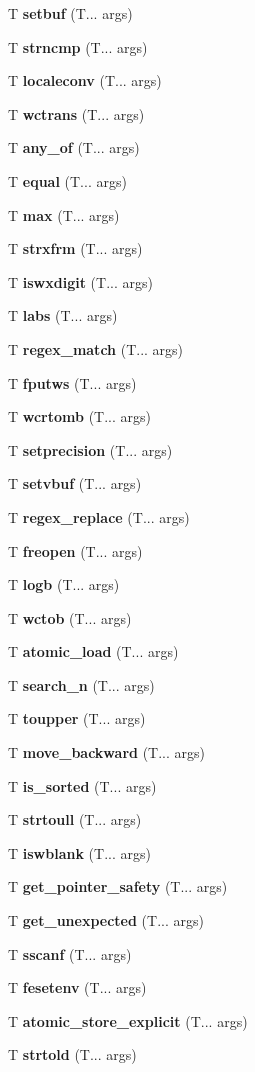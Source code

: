 \begin{DoxyCompactItemize}
T \textbf{ setbuf} (T... args)
\item 
T \textbf{ strncmp} (T... args)
\item 
T \textbf{ localeconv} (T... args)
\item 
T \textbf{ wctrans} (T... args)
\item 
T \textbf{ any\+\_\+of} (T... args)
\item 
T \textbf{ equal} (T... args)
\item 
T \textbf{ max} (T... args)
\item 
T \textbf{ strxfrm} (T... args)
\item 
T \textbf{ iswxdigit} (T... args)
\item 
T \textbf{ labs} (T... args)
\item 
T \textbf{ regex\+\_\+match} (T... args)
\item 
T \textbf{ fputws} (T... args)
\item 
T \textbf{ wcrtomb} (T... args)
\item 
T \textbf{ setprecision} (T... args)
\item 
T \textbf{ setvbuf} (T... args)
\item 
T \textbf{ regex\+\_\+replace} (T... args)
\item 
T \textbf{ freopen} (T... args)
\item 
T \textbf{ logb} (T... args)
\item 
T \textbf{ wctob} (T... args)
\item 
T \textbf{ atomic\+\_\+load} (T... args)
\item 
T \textbf{ search\+\_\+n} (T... args)
\item 
T \textbf{ toupper} (T... args)
\item 
T \textbf{ move\+\_\+backward} (T... args)
\item 
T \textbf{ is\+\_\+sorted} (T... args)
\item 
T \textbf{ strtoull} (T... args)
\item 
T \textbf{ iswblank} (T... args)
\item 
T \textbf{ get\+\_\+pointer\+\_\+safety} (T... args)
\item 
T \textbf{ get\+\_\+unexpected} (T... args)
\item 
T \textbf{ sscanf} (T... args)
\item 
T \textbf{ fesetenv} (T... args)
\item 
T \textbf{ atomic\+\_\+store\+\_\+explicit} (T... args)
\item 
T \textbf{ strtold} (T... args)
\item 

\end{DoxyCompactItemize}
